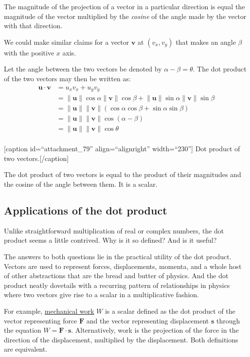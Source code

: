 \documentclass[
  a4paper,
]{article}
\begin{document}
The magnitude of the projection of a vector in a particular direction is
equal the magnitude of the vector multiplied by the \emph{cosine} of the
angle made by the vector with that direction.

We could make similar claims for a vector \(\mathbf{v}\) at
\((v_{x}, v_{y})\) that makes an angle \(\beta\) with the positive \(x\)
axis.

Let the angle between the two vectors be denoted by
\(\alpha - \beta = \theta\). The dot product of the two vectors may then
be written as: \[
\begin{aligned}
\mathbf{u} \cdot \mathbf{v} &= u_{x}v_{x} + u_{y}v_{y}\\
&= \lVert\mathbf{u}\rVert\cos\alpha\lVert\mathbf{v}\rVert\cos\beta + \lVert\mathbf{u}\rVert\sin\alpha\lVert\mathbf{v}\rVert\sin\beta\\
&= \lVert\mathbf{u}\rVert\lVert\mathbf{v}\rVert(\cos\alpha\cos\beta + \sin\alpha\sin\beta)\\
&= \lVert\mathbf{u}\rVert\lVert\mathbf{v}\rVert\cos(\alpha - \beta)\\
&= \lVert\mathbf{u}\rVert\lVert\mathbf{v}\rVert\cos\theta\\
\end{aligned}
\]

{[}caption id=``attachment\_79'' align=``alignright'' width=``230''{]}
Dot product of two vectors.{[}/caption{]}

The dot product of two vectors is equal to the product of their
magnitudes and the cosine of the angle between them. It is a scalar.

\hypertarget{applications-of-the-dot-product}{%
\subsection{Applications of the dot
product}\label{applications-of-the-dot-product}}

Unlike straightforward multiplication of real or complex numbers, the
dot product seems a little contrived. Why is it so defined? And is it
useful?

The answers to both questions lie in the practical utility of the dot
product. Vectors are used to represent forces, displacements, momenta,
and a whole host of other abstractions that are the bread and butter of
physics. And the dot product neatly dovetails with a recurring pattern
of relationships in physics where two vectors give rise to a scalar in a
multiplicative fashion.

For example,
\href{http://en.wikipedia.org/wiki/Work_\%28physics\%29}{mechanical
work} \(W\) is a scalar defined as the dot product of the vector
representing force \(\mathbf{F}\) and the vector representing
displacement \(\mathbf{s}\) through the equation
\(W = \mathbf{F}\cdot\mathbf{s}\). Alternatively, work is the projection
of the force in the direction of the displacement, multiplied by the
displacement. Both definitions are equivalent.
\end{document}
